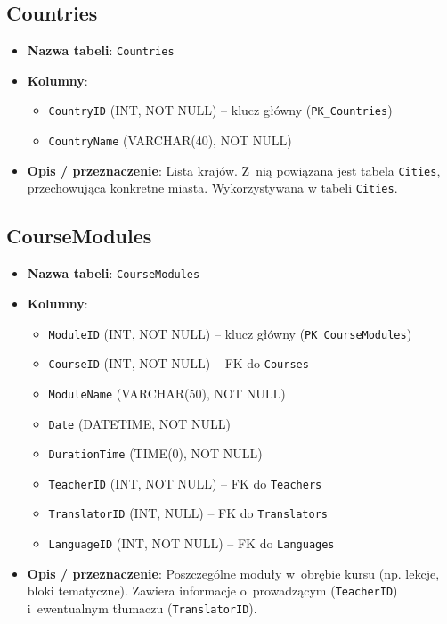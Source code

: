 \documentclass[12pt]{article}
\begin{document}
\subsection{Countries}
\begin{itemize}
    \item \textbf{Nazwa tabeli}: \texttt{Countries}
    \item \textbf{Kolumny}:
          \begin{itemize}
            \item \texttt{CountryID} (INT, NOT NULL) -- klucz główny (\texttt{PK\_Countries})
            \item \texttt{CountryName} (VARCHAR(40), NOT NULL)
          \end{itemize}
    \item \textbf{Opis / przeznaczenie}:  
          Lista krajów. Z~nią powiązana jest tabela \texttt{Cities}, przechowująca konkretne miasta. Wykorzystywana w tabeli \texttt{Cities}.
\end{itemize}

\subsection{CourseModules}
\begin{itemize}
    \item \textbf{Nazwa tabeli}: \texttt{CourseModules}
    \item \textbf{Kolumny}:
          \begin{itemize}
            \item \texttt{ModuleID} (INT, NOT NULL) -- klucz główny (\texttt{PK\_CourseModules})
            \item \texttt{CourseID} (INT, NOT NULL) -- FK do \texttt{Courses}
            \item \texttt{ModuleName} (VARCHAR(50), NOT NULL)
            \item \texttt{Date} (DATETIME, NOT NULL)
            \item \texttt{DurationTime} (TIME(0), NOT NULL)
            \item \texttt{TeacherID} (INT, NOT NULL) -- FK do \texttt{Teachers}
            \item \texttt{TranslatorID} (INT, NULL) -- FK do \texttt{Translators}
            \item \texttt{LanguageID} (INT, NOT NULL) -- FK do \texttt{Languages}
          \end{itemize}
    \item \textbf{Opis / przeznaczenie}:  
          Poszczególne moduły w~obrębie kursu (np. lekcje, bloki tematyczne). Zawiera informacje 
          o~prowadzącym (\texttt{TeacherID}) i~ewentualnym tłumaczu (\texttt{TranslatorID}).
\end{itemize}
\end{document}
